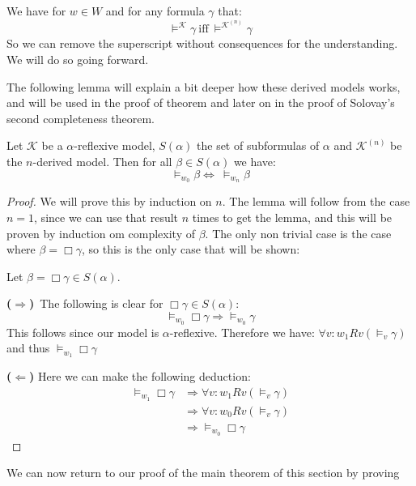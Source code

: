 \documentclass[../main.tex]{subfiles}
\begin{document}
\begin{remark}
	We have for $w\in W$ and for any formula $\gamma$ that:
	\[\vDash^{\mathcal{K}}\gamma\ \text{iff}\
	\vDash^{\mathcal{K}^{(n)}}\gamma\]
	So we can remove the superscript without consequences for the
	understanding. We will do so going forward.
\end{remark}

The following lemma will explain a bit deeper how these derived models works,
and will be used in the proof of theorem and later on in the proof of Solovay's
second completeness theorem.

\begin{lem}
	\label{lem:GLS}
	Let $\mathcal{K}$ be a $\alpha$-reflexive model, $S(\alpha)$ the set of
	subformulas of $\alpha$ and $\mathcal{K}^{(n)}$ be the $n$-derived
	model. Then for all $\beta\in S(\alpha)$ we have:
	$$\vDash_{w_0}\beta\Leftrightarrow\ \vDash_{w_n}\beta$$
\end{lem}
\begin{proof}
	We will prove this by induction on $n$. The lemma will follow from the
	case $n=1$, since we can use that result $n$ times to get the lemma, and this will be proven by induction om complexity
	of $\beta$. The only non trivial case is the case where
	$\beta=\Box\gamma$, so this is the only case that will be shown:

	Let $\beta=\Box\gamma\in S(\alpha)$. 

	\textbf{($\Rightarrow$)}\ The following is clear for
	$\Box\gamma\in S(\alpha)$:
	\[\vDash_{w_0}\Box\gamma\Rightarrow\vDash_{w_0}\gamma\]
	This follows since our model is $\alpha$-reflexive. Therefore we have:
	$\forall v:w_1Rv(\vDash_{v}\gamma)$ and thus $\vDash_{w_1}\Box\gamma$

	\textbf{($\Leftarrow$)} Here we can make the following deduction:
	\begin{align*}
		\vDash_{w_1}\Box\gamma&\Rightarrow\forall
		v:w_1Rv(\vDash_v\gamma)\\
				      &\Rightarrow\forall
				      v:w_0Rv(\vDash_v\gamma)\\
				      &\Rightarrow\vDash_{w_0}\Box\gamma
	\end{align*}
\end{proof}
We can now return to our proof of the main theorem of this section by proving
\end{document}
